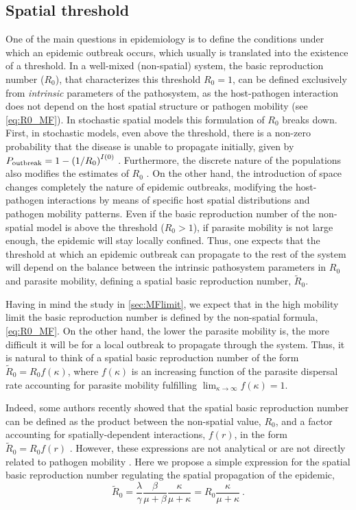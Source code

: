 \subsection{Spatial threshold}

One of the main questions in epidemiology is to define the conditions under
which an epidemic outbreak occurs, which usually is translated into the
existence of a threshold. In a well-mixed (non-spatial) system, the basic
reproduction number ($R_0$), that characterizes this threshold $R_0=1$, can be
defined exclusively from \textit{intrinsic} parameters of the pathosystem, as
the host-pathogen interaction does not depend on the host spatial structure or
pathogen mobility (see \cref{eq:R0_MF}). In stochastic spatial models this
formulation of $R_0$ breaks down. First, in stochastic models, even
above the threshold, there is a non-zero probability that the disease is unable
to propagate initially, given by
$P_{\textrm{outbreak}}=1-\left(1/R_0\right)^{I(0)}$ \cite{Brauer2008}.
Furthermore, the discrete nature of the populations also modifies the estimates
of $R_0$ \cite{KEELING200051}. On the other hand, the introduction of space
changes completely the nature of epidemic outbreaks, modifying the
host-pathogen interactions by means of specific host spatial distributions and
pathogen mobility patterns. Even if the basic reproduction number of the
non-spatial model is above the threshold ($R_0>1$), if parasite mobility is not
large enough, the epidemic will stay locally confined. Thus, one expects that
the threshold at which an epidemic outbreak can propagate to the rest of the
system will depend on the balance between the intrinsic pathosystem parameters
in $R_0$ and parasite mobility, defining a spatial basic reproduction number,
$\tilde{R}_0$.

Having in mind the study in \cref{sec:MFlimit}, we expect that in the high
mobility limit the basic reproduction number is defined by the non-spatial
formula, \cref{eq:R0_MF}. On the other hand, the lower the parasite mobility
is, the more difficult it will be for a local outbreak to propagate through the
system. Thus, it is natural to think of a spatial basic reproduction number of
the form $\tilde{R}_0=R_0 f(\kappa)$, where $f(\kappa)$ is an increasing
function of the parasite dispersal rate accounting for parasite mobility
fulfilling $\lim_{\kappa\to\infty}f(\kappa)=1$.

Indeed, some authors recently showed that the spatial basic reproduction
number can be defined as the product between the non-spatial value, $R_0$, and
a factor accounting for spatially-dependent interactions, $f(r)$, in the form
$\tilde{R}_0=R_0f(r)$ \cite{Filipe2003,Filipe2004,Gilligan2021}. However, these
expressions are not analytical \cite{Filipe2003,Filipe2004} or are not directly
related to pathogen mobility \cite{Gilligan2021}. Here we propose a simple
expression for the spatial basic reproduction number regulating the spatial
propagation of the epidemic,
\begin{equation}\label{eq:R_0ibm}
    \tilde{R}_0=\frac{\lambda}{\gamma}\frac{\beta}{\mu+\beta}
    \frac{\kappa}{\mu+\kappa}=R_0\frac{\kappa}{\mu+\kappa}
    \ .
\end{equation}

